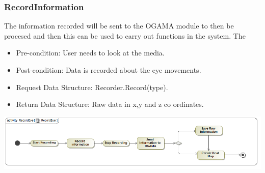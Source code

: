 \subsubsection{RecordInformation}
The information recorded will be sent to the OGAMA module to then be procesed and then this can be used to carry out functions in the system.
The
\begin{itemize}
\item Pre-condition: User needs to look at the media.
\item Post-condition: Data is recorded about the eye movements.
\item Request Data Structure: Recorder.Record(type).
\item Return Data Structure: Raw data in x,y and z co ordinates.
\end{itemize}

\includegraphics[scale=0.5]{Diagrams/Activity_Diagram__RecordEye__RecordEye.png}


